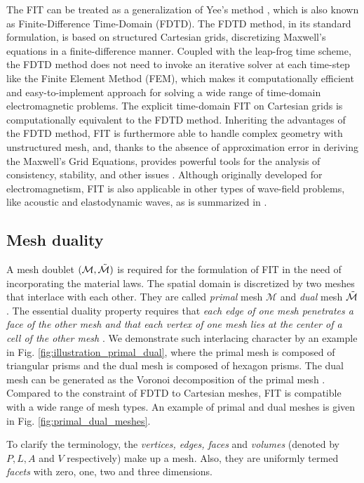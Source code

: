 \documentclass{report}
\begin{document}
The FIT can be treated as a generalization of Yee's method \citep{yee_1966}, which is also known as Finite-Difference Time-Domain (FDTD). The FDTD method, in its standard formulation, is based on structured Cartesian grids, discretizing Maxwell's equations in a finite-difference manner. Coupled with the leap-frog time scheme, the FDTD method does not need to invoke an iterative solver at each time-step like the Finite Element Method (FEM), which makes it computationally efficient and easy-to-implement approach for solving a wide range of time-domain electromagnetic problems. The explicit time-domain FIT on Cartesian grids is computationally equivalent to the FDTD method. Inheriting the advantages of the FDTD method, FIT is furthermore able to handle complex geometry with unstructured mesh, and, thanks to the absence of approximation error in deriving the Maxwell's Grid Equations, provides powerful tools for the analysis of consistency, stability, and other issues \citep{weiland_2003}. Although originally developed for electromagnetism, FIT is also applicable in other types of wave-field problems, like acoustic and elastodynamic waves, as is summarized in \cite{marklein_2002}.

\subsection{Mesh duality} \label{sec:mesh_duality}

A mesh doublet $(\mathcal{M}, \Tilde{\mathcal{M}})$ is required for the formulation of FIT in the need of incorporating the material laws. The spatial domain is discretized by two meshes that interlace with each other. They are called \emph{primal} mesh $\mathcal{M}$ and \emph{dual} mesh $\Tilde{\mathcal{M}}$. The essential duality property requires that \emph{each edge of one mesh penetrates a face of the other mesh and that each vertex of one mesh lies at the center of a cell of the other mesh} \citep{weiland_2003}. We demonstrate such interlacing character by an example in Fig. \ref{fig:illustration_primal_dual}, where the primal mesh is composed of triangular prisms and the dual mesh is composed of hexagon prisms. The dual mesh can be generated as the Voronoi decomposition of the primal mesh \citep{fuchs_2021}. Compared to the constraint of FDTD to Cartesian meshes, FIT is compatible with a wide range of mesh types. An example of primal and dual meshes is given in Fig. \ref{fig:primal_dual_meshes}.

To clarify the terminology, the \emph{vertices, edges, faces} and \emph{volumes} (denoted by $P,L,A$ and $V$ respectively) make up a mesh. Also, they are uniformly termed \emph{facets} with zero, one, two and three dimensions. 
\end{document}
